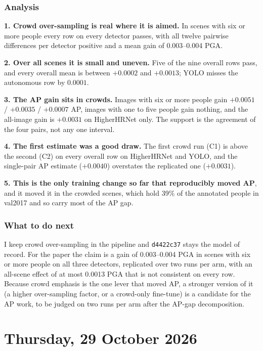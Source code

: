\subsubsection{Analysis}

\textbf{1. Crowd over-sampling is real where it is aimed.} In scenes with six or more people every row on every detector passes, with all twelve pairwise differences per detector positive and a mean gain of 0.003--0.004 PGA.

\textbf{2. Over all scenes it is small and uneven.} Five of the nine overall rows pass, and every overall mean is between $+0.0002$ and $+0.0013$; YOLO misses the autonomous row by $0.0001$.

\textbf{3. The AP gain sits in crowds.} Images with six or more people gain $+0.0051$ / $+0.0035$ / $+0.0007$ AP, images with one to five people gain nothing, and the all-image gain is $+0.0031$ on HigherHRNet only. The support is the agreement of the four pairs, not any one interval.

\textbf{4. The first estimate was a good draw.} The first crowd run (C1) is above the second (C2) on every overall row on HigherHRNet and YOLO, and the single-pair AP estimate ($+0.0040$) overstates the replicated one ($+0.0031$).

\textbf{5. This is the only training change so far that reproducibly moved AP}, and it moved it in the crowded scenes, which hold 39\% of the annotated people in val2017 and so carry most of the AP gap.

\subsubsection{What to do next}

I keep crowd over-sampling in the pipeline and \texttt{d4422c37} stays the model of record.
For the paper the claim is a gain of 0.003--0.004 PGA in scenes with six or more people on all three detectors, replicated over two runs per arm, with an all-scene effect of at most 0.0013 PGA that is not consistent on every row.
Because crowd emphasis is the one lever that moved AP, a stronger version of it (a higher over-sampling factor, or a crowd-only fine-tune) is a candidate for the AP work, to be judged on two runs per arm after the AP-gap decomposition.

\section[2026/10/29]{Thursday, 29 October 2026}

